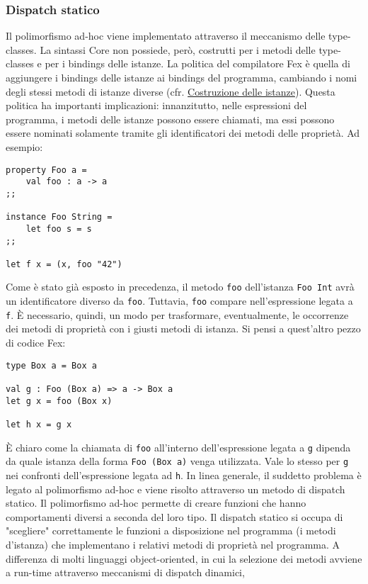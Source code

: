\documentclass[10pt,a4paper]{article}
\begin{document}
\hypertarget{Dispatch statico}{\subsubsection{Dispatch statico}}
Il polimorfismo ad-hoc viene implementato attraverso il meccanismo delle type-classes.
La sintassi Core non possiede, però, costrutti per i metodi delle type-classes e per i bindings delle istanze.
La politica del compilatore Fex è quella di aggiungere i bindings delle istanze ai bindings del programma,
cambiando i nomi degli stessi metodi di istanze diverse
(cfr. \hyperlink{Costruzione delle istanze}{Costruzione delle istanze}). Questa politica ha
importanti implicazioni: innanzitutto, nelle espressioni del programma, i metodi delle istanze possono essere chiamati,
ma essi possono essere nominati solamente tramite gli identificatori dei metodi delle proprietà. Ad esempio:
\begin{lstlisting}
property Foo a =
    val foo : a -> a
;;

instance Foo String =
    let foo s = s
;;

let f x = (x, foo "42")
\end{lstlisting}
Come è stato già esposto in precedenza, il metodo \texttt{foo} dell'istanza \texttt{Foo Int} avrà un identificatore
diverso da \texttt{foo}. Tuttavia, \texttt{foo} compare nell'espressione legata a \texttt{f}. \`E necessario,
quindi, un modo per trasformare, eventualmente, le occorrenze dei metodi di proprietà con i giusti metodi di istanza.
Si pensi a quest'altro pezzo di codice Fex:
\begin{lstlisting}
type Box a = Box a

val g : Foo (Box a) => a -> Box a
let g x = foo (Box x)

let h x = g x
\end{lstlisting}
\`E chiaro come la chiamata di \texttt{foo} all'interno dell'espressione legata a \texttt{g} dipenda da quale istanza
della forma \texttt{Foo (Box a)} venga utilizzata. Vale lo stesso per \texttt{g} nei confronti dell'espressione legata
ad \texttt{h}. In linea generale, il suddetto problema è legato al polimorfismo ad-hoc e viene risolto attraverso un
metodo di dispatch statico. Il polimorfismo ad-hoc permette di creare funzioni che hanno comportamenti diversi a
seconda del loro tipo. Il dispatch statico si occupa di "scegliere" correttamente le funzioni a disposizione nel
programma (i metodi d'istanza) che implementano i relativi metodi di proprietà nel programma. A differenza di molti
linguaggi object-oriented, in cui la selezione dei metodi avviene a run-time attraverso meccanismi di dispatch dinamici,
\end{document}
